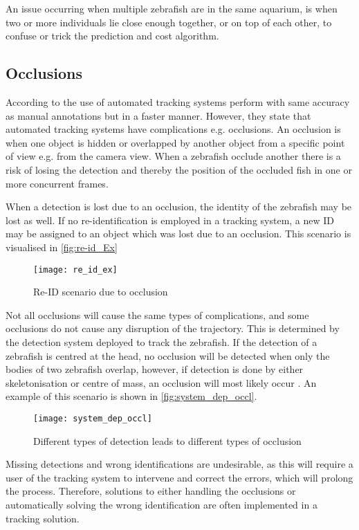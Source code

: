 An issue occurring when multiple zebrafish are in the same aquarium, is when two or more individuals lie close enough together, or on top of each other, to confuse or trick the prediction and cost algorithm.

\subsection{Occlusions}
According to  \cite{Green2012} the use of automated tracking systems perform with same accuracy as manual annotations but in a faster manner. However, they state that automated tracking systems have complications e.g. occlusions. An occlusion is when one object is hidden or overlapped by another object from a specific point of view e.g. from the camera view. When a zebrafish occlude another there is a risk of losing the detection and thereby the position of the occluded fish in one or more concurrent frames.

When a detection is lost due to an occlusion, the identity of the zebrafish may be lost as well. If no re-identification is employed in a tracking system, a new ID may be assigned to an object which was lost due to an occlusion. This scenario is visualised in \autoref{fig:re-id_Ex}

\begin{figure}[H]
	\centering
	\texttt{[image: re\_id\_ex]}
	\caption{Re-ID scenario due to occlusion}
	\label{fig:re-id_Ex}
\end{figure}

Not all occlusions will cause the same types of complications, and some occlusions do not cause any disruption of the trajectory. This is determined by the detection system deployed to track the zebrafish. If the detection of a zebrafish is centred at the head, no occlusion will be detected when only the bodies of two zebrafish overlap, however, if detection is done by either skeletonisation or centre of mass, an occlusion will most likely occur \citep{Feijo2018}. An example of this scenario is shown in \autoref{fig:system_dep_occl}.

\begin{figure}[H]
	\centering
	\texttt{[image: system\_dep\_occl]}
	\caption{Different types of detection leads to different types of occlusion}
	\label{fig:system_dep_occl}
\end{figure}

Missing detections and wrong identifications are undesirable, as this will require a user of the tracking system to intervene and correct the errors, which will prolong the process. Therefore, solutions to either handling the occlusions or automatically solving the wrong identification are often implemented in a tracking solution.

